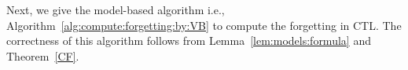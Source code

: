 \documentclass{article}
\begin{document}


Next, we give the model-based algorithm i.e., Algorithm~\ref{alg:compute:forgetting:by:VB} to compute the forgetting in CTL.
The correctness of this algorithm follows from Lemma~\ref{lem:models:formula} and Theorem~\ref{CF}.
\end{document}
